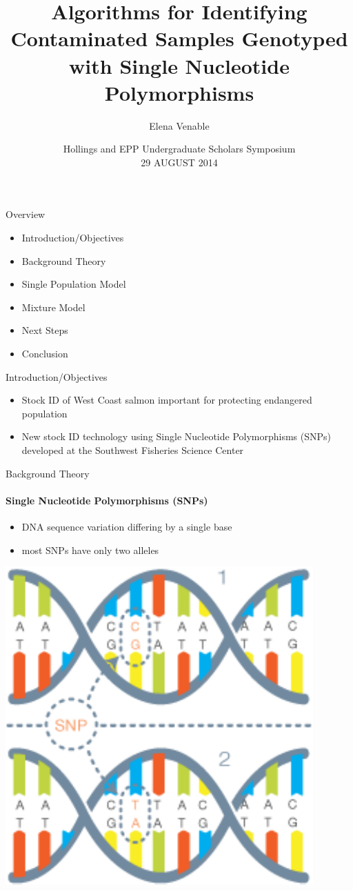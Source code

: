 \documentclass[letter,graphicx]{beamer}
\title[SNP contamination identification with Bayesian methods\hspace{2em}\insertframenumber] %
{Algorithms for Identifying Contaminated Samples Genotyped with Single Nucleotide Polymorphisms}
\subtitle{} %
\author[Elena Venable] %
{Elena Venable}
\institute[Brown Univeristy] %
{
Brown University \\ Applied Mathematics - Biology \\ Healthy Oceans \\ Southwest Fisheries Science Center, Santa Cruz, CA \\ Eric C. Anderson
}
\date[CSGM--2014] %
{
 Hollings and EPP Undergraduate Scholars Symposium \\ 29 AUGUST 2014}
\begin{document}
\begin{frame}
  \titlepage
\end{frame}

\begin{frame}{Overview}
   \begin{itemize}
	\item Introduction/Objectives
	\item Background Theory
	\item Single Population Model
	\item Mixture Model
	\item Next Steps
	\item Conclusion
   \end{itemize}
\end{frame}

\begin{frame}{Introduction/Objectives}
   \begin{itemize}
	\item Stock ID of West Coast salmon important for protecting endangered population
	\vspace{3mm}
	\item New stock ID technology using Single Nucleotide Polymorphisms (SNPs) developed at the Southwest Fisheries Science Center
   \end{itemize}
\end{frame}

\begin{frame}{Background Theory}
\framesubtitle{Single Nucleotide Polymorphisms (SNPs)}
\begin{itemize}
\item DNA sequence variation differing by a single base
\vspace{2mm}
\item most SNPs have only two alleles 
\end{itemize}
\begin{center}
\includegraphics[width=.5\textwidth]{images/snp_diagram}
\end{center}
\end{frame}
\end{document}

